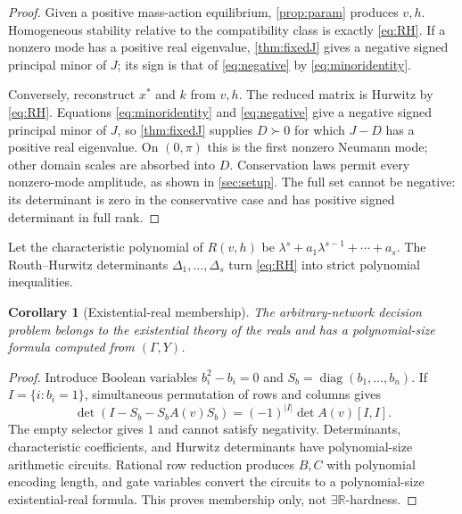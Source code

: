 \documentclass[11pt]{article}
\newtheorem{corollary}[theorem]{Corollary}
\theoremstyle{definition}
\newcommand{\R}{\mathbb R}
\newcommand{\diag}{\operatorname{diag}}
\begin{document}
\begin{proof}
Given a positive mass-action equilibrium, \cref{prop:param} produces $v,h$.
Homogeneous stability relative to the compatibility class is exactly
\eqref{eq:RH}.  If a nonzero mode has a positive real eigenvalue,
\cref{thm:fixedJ} gives a negative signed principal minor of $J$; its sign is
that of \eqref{eq:negative} by \eqref{eq:minoridentity}.

Conversely, reconstruct $x^*$ and $k$ from $v,h$.  The reduced matrix is
Hurwitz by \eqref{eq:RH}.  Equations \eqref{eq:minoridentity} and
\eqref{eq:negative} give a negative signed principal minor of $J$, so
\cref{thm:fixedJ} supplies $D\succ0$ for which $J-D$ has a positive real
eigenvalue.  On $(0,\pi)$ this is the first nonzero Neumann mode; other domain
scales are absorbed into $D$.  Conservation laws permit every nonzero-mode
amplitude, as shown in \cref{sec:setup}.  The full set cannot be negative:
its determinant is zero in the conservative case and has positive signed
determinant in full rank.
\end{proof}

Let the characteristic polynomial of $R(v,h)$ be
$\lambda^s+a_1\lambda^{s-1}+\cdots+a_s$.  The Routh--Hurwitz determinants
$\Delta_1,\ldots,\Delta_s$ turn \eqref{eq:RH} into strict polynomial
inequalities.

\begin{corollary}[Existential-real membership]
\label{cor:etrmembership}
The arbitrary-network decision problem belongs to the existential theory of
the reals and has a polynomial-size formula computed from $(\Gamma,Y)$.
\end{corollary}

\begin{proof}
Introduce Boolean variables $b_i^2-b_i=0$ and
$S_b=\diag(b_1,\ldots,b_n)$.  If $I=\{i:b_i=1\}$, simultaneous permutation of
rows and columns gives
\begin{equation}
 \det(I-S_b-S_bA(v)S_b)=(-1)^{|I|}\det A(v)[I,I].
 \label{eq:selector}
\end{equation}
The empty selector gives $1$ and cannot satisfy negativity.  Determinants,
characteristic coefficients, and Hurwitz determinants have polynomial-size
arithmetic circuits.  Rational row reduction produces $B,C$ with polynomial
encoding length, and gate variables convert the circuits to a polynomial-size
existential-real formula.  This proves membership only, not
$\exists\R$-hardness.
\end{proof}
\end{document}
